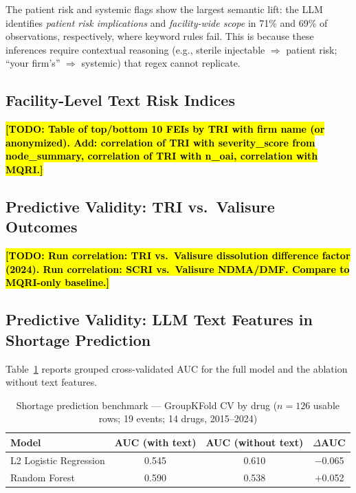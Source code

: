 \documentclass[12pt]{article}
\newcommand{\todo}[1]{\hl{\textbf{[TODO: #1]}}}
\begin{document}
The patient risk and systemic flags show the largest semantic lift:
the LLM identifies \emph{patient risk implications} and \emph{facility-wide
scope} in 71\% and 69\% of observations, respectively, where keyword
rules fail.
This is because these inferences require contextual reasoning
(e.g., sterile injectable $\Rightarrow$ patient risk; ``your firm's''
$\Rightarrow$ systemic) that regex cannot replicate.

\subsection{Facility-Level Text Risk Indices}

\todo{Table of top/bottom 10 FEIs by TRI with firm name (or anonymized).
Add: correlation of TRI with severity\_score from node\_summary,
correlation of TRI with n\_oai, correlation with MQRI.}

\subsection{Predictive Validity: TRI vs.\ Valisure Outcomes}

\todo{Run correlation: TRI vs.\ Valisure dissolution difference factor (2024).
Run correlation: SCRI vs.\ Valisure NDMA/DMF.
Compare to MQRI-only baseline.}

\subsection{Predictive Validity: LLM Text Features in Shortage Prediction}

Table~\ref{tab:model} reports grouped cross-validated AUC for the full model
and the ablation without text features.

\begin{table}[h!]
\centering
\caption{Shortage prediction benchmark — GroupKFold CV by drug
         ($n=126$ usable rows; 19 events; 14 drugs, 2015--2024)}
\label{tab:model}
\begin{tabular}{lccc}
\toprule
\textbf{Model} & \textbf{AUC (with text)} & \textbf{AUC (without text)} & \textbf{$\Delta$AUC} \\
\midrule
L2 Logistic Regression & 0.545 & 0.610 & $-$0.065 \\
Random Forest          & 0.590 & 0.538 & $+$0.052 \\
\bottomrule
\end{tabular}
\end{table}
\end{document}
